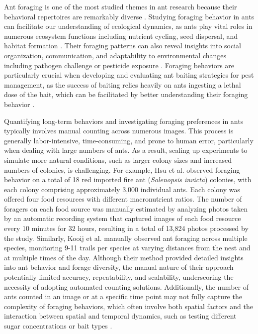 Ant foraging is one of the most studied themes in ant research because their behavioral repertoires are remarkably diverse \cite{reeves_evolution_2019}. Studying foraging behavior in ants can facilitate our understanding of ecological dynamics, as ants play vital roles in numerous ecosystem functions including nutrient cycling, seed dispersal, and habitat formation \cite{parr_response_2022, rocha_two_2024}. Their foraging patterns can also reveal insights into social organization, communication, and adaptability to environmental changes including pathogen challenge \cite{alciatore_immune_2021} or pesticide exposure \cite{thiel_sublethal_2016}. Foraging behaviors are particularly crucial when developing and evaluating ant baiting strategies for pest management, as the success of baiting relies heavily on ants ingesting a lethal dose of the bait, which can be facilitated by better understanding their foraging behavior \cite{galante_acute_2024}.

Quantifying long-term behaviors and investigating foraging preferences in ants typically involves manual counting across numerous images. This process is generally labor-intensive, time-consuming, and prone to human error, particularly when dealing with large numbers of ants. As a result, scaling up experiments to simulate more natural conditions, such as larger colony sizes and increased numbers of colonies, is challenging. For example, Hsu et al. \cite{hsu_viral_2018} observed foraging behavior on a total of 18 red imported fire ant (\emph{Solenopsis invicta}) colonies, with each colony comprising approximately 3,000 individual ants. Each colony was offered four food resources with different macronutrient ratios. The number of foragers on each food source was manually estimated by analyzing photos taken by an automatic recording system that captured images of each food resource every 10 minutes for 32 hours, resulting in a total of 13,824 photos processed by the study. Similarly, Kooij et al. \cite{kooij_differences_2014} manually observed ant foraging across multiple species, monitoring 9-11 trails per species at varying distances from the nest and at multiple times of the day. Although their method provided detailed insights into ant behavior and forage diversity, the manual nature of their approach potentially limited accuracy, repeatability, and scalability, underscoring the necessity of adopting automated counting solutions. Additionally, the number of ants counted in an image or at a specific time point may not fully capture the complexity of foraging behaviors, which often involve both spatial factors and the interaction between spatial and temporal dynamics, such as testing different sugar concentrations \cite{sola_feeding_2016} or bait types \cite{du_foraging_2023}.
    
